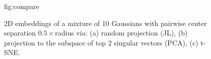  \begin{figure}[htbp]
 	\floatconts
 	{fig:compare}%
 	{\caption{\small 2D embeddings of a mixture of 10 Gaussians with pairwise center separation $0.5\times$radius via: (a) random projection (JL), (b) projection to the subspace of top 2 singular vectors (PCA), (c) t-SNE.%
 	}}
 	{%
 		\qquad %
 		\qquad
 		\qquad
 	}
 \end{figure}
 
